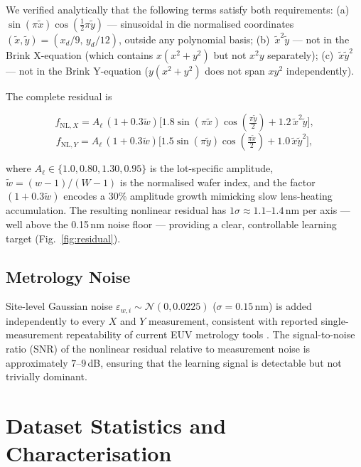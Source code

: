 \documentclass[10pt,conference]{IEEEtran}
\begin{document}
We verified analytically that the following terms satisfy both requirements:
(a)~$\sin(\pi\tilde{x})\cos(\tfrac{1}{2}\pi\tilde{y})$ — sinusoidal in
die normalised coordinates $(\tilde{x},\tilde{y}) = (x_d/9,\, y_d/12)$,
outside any polynomial basis;
(b)~$\tilde{x}^2\tilde{y}$ — not in the Brink X-equation (which contains
$x(x^2\!+\!y^2)$ but not $x^2 y$ separately);
(c)~$\tilde{x}\tilde{y}^2$ — not in the Brink Y-equation
($y(x^2\!+\!y^2)$ does not span $xy^2$ independently).

The complete residual is

\begin{equation}
  f_{\mathrm{NL},X}
  = A_\ell\,(1 + 0.3\tilde{w})\!
    \bigl[1.8\sin(\pi\tilde{x})\cos(\tfrac{\pi\tilde{y}}{2})
           + 1.2\,\tilde{x}^2\tilde{y}\bigr],
  \label{eq:nl_x}
\end{equation}
\begin{equation}
  f_{\mathrm{NL},Y}
  = A_\ell\,(1 + 0.3\tilde{w})\!
    \bigl[1.5\sin(\pi\tilde{y})\cos(\tfrac{\pi\tilde{x}}{2})
           + 1.0\,\tilde{x}\tilde{y}^2\bigr],
  \label{eq:nl_y}
\end{equation}

\noindent where $A_\ell \in \{1.0, 0.80, 1.30, 0.95\}$ is the lot-specific
amplitude, $\tilde{w}\!=\!(w-1)/(W-1)$ is the normalised wafer index, and
the factor $(1+0.3\tilde{w})$ encodes a 30\% amplitude growth mimicking
slow lens-heating accumulation.  The resulting nonlinear residual has
$1\sigma \approx 1.1$–$1.4$\,nm per axis — well above the 0.15\,nm noise
floor — providing a clear, controllable learning target
(Fig.~\ref{fig:residual}).

\subsection{Metrology Noise}

Site-level Gaussian noise $\varepsilon_{w,i} \sim \mathcal{N}(0, 0.0225)$
($\sigma\!=\!0.15$\,nm) is added independently to every $X$ and $Y$
measurement, consistent with reported single-measurement repeatability of
current EUV metrology tools \cite{phillips2020}.  The signal-to-noise ratio
(SNR) of the nonlinear residual relative to measurement noise is
approximately $7$–$9$\,dB, ensuring that the learning signal is detectable
but not trivially dominant.

\section{Dataset Statistics and Characterisation}
\end{document}

